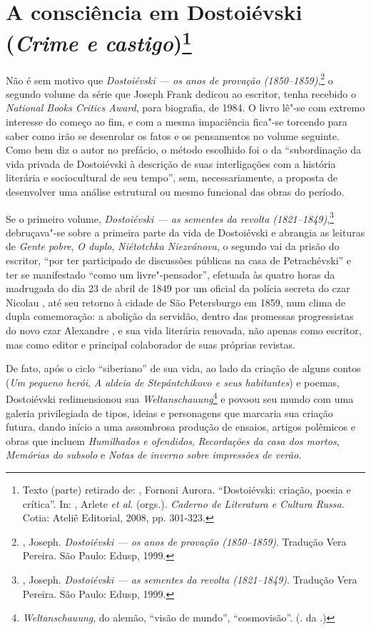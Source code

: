 \chapter{A consciência em Dostoiévski\\ (\emph{Crime e castigo})\footnote{Texto (parte) retirado de: \protect{}, Fornoni Aurora. ``Dostoiévski: criação, poesia e crítica''. In: \protect{}, Arlete \emph{et al}. (orgs.). \emph{Caderno de Literatura e Cultura Russa}. Cotia: Ateliê Editorial, 2008, pp. 301-323.}}
\label{crimecastigo}

Não é sem motivo que \emph{Dostoiévski --- os anos de provação (1850--1859)},\footnote{, Joseph. \emph{Dostoiévski --- os anos de provação (1850--1859)}. Tradução Vera Pereira. São Paulo: Edusp, 1999.} o segundo volume da série que Joseph Frank dedicou ao escritor, tenha recebido o \emph{National Books Critics Award}, para biografia, de 1984. O livro lê"-se com extremo interesse do começo ao fim, e com a mesma impaciência fica"-se torcendo para saber como irão se desenrolar os fatos e os pensamentos no volume seguinte. Como bem diz o autor no prefácio, o método escolhido foi o da ``subordinação da vida privada de Dostoiévski à descrição de suas interligações com a história literária e sociocultural de seu tempo'', sem, necessariamente, a proposta de desenvolver uma análise estrutural ou mesmo funcional das obras do período.

Se o primeiro volume, \emph{Dostoiévski --- as sementes da revolta
(1821--1849)},\footnote{, Joseph. \emph{Dostoiévski --- as sementes
da revolta (1821--1849)}. Tradução Vera Pereira. São Paulo: Edusp,
  1999.} debruçava"-se sobre a primeira parte da vida de Dostoiévski e
abrangia as leituras de \emph{Gente pobre}, \emph{O duplo},
\emph{Niétotchka Niezvánova}, o segundo vai da prisão do escritor, ``por
ter participado de discussões públicas na casa de Petrachévski'' e ter
se manifestado ``como um livre"-pensador'', efetuada às quatro horas da
madrugada do dia 23 de abril de 1849 por um oficial da polícia secreta
do czar Nicolau , até seu retorno à cidade de São Petersburgo em 1859,
num clima de dupla comemoração: a abolição da servidão, dentro das
promessas progressistas do novo czar Alexandre , e sua vida literária
renovada, não apenas como escritor, mas como editor e principal
colaborador de suas próprias revistas.

De fato, após o ciclo ``siberiano'' de sua vida, ao lado da criação de
alguns contos (\emph{Um pequeno herói}, \emph{A aldeia de Stepántchikovo
e seus habitantes}) e poemas, Dostoiévski redimensionou sua
\emph{Weltanschauung}\footnote{\emph{Weltanschauung}, do alemão, ``visão de mundo'', ``cosmovisão''. (. da .)} e povoou seu mundo com uma galeria privilegiada de
tipos, ideias e personagens que marcaria sua criação futura, dando
início a uma assombrosa produção de ensaios, artigos polêmicos e obras
que incluem \emph{Humilhados e ofendidos}, \emph{Recordações da casa dos
mortos}, \emph{Memórias do subsolo} e \emph{Notas de inverno sobre
impressões de verão}.

